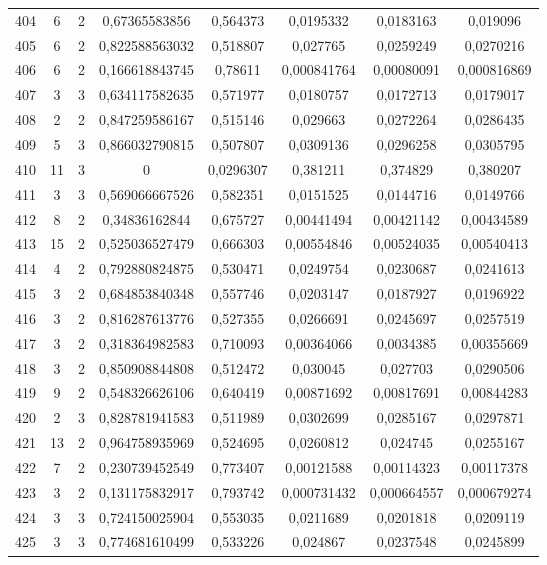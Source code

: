 \begin{longtable}{|c|c|c|c|c|c|c|c|}
404 & 6 & 2 & 0,67365583856 & 0,564373 & 0,0195332 & 0,0183163 & 0,019096  \\
405 & 6 & 2 & 0,822588563032 & 0,518807 & 0,027765 & 0,0259249 & 0,0270216  \\
406 & 6 & 2 & 0,166618843745 & 0,78611 & 0,000841764 & 0,00080091 & 0,000816869  \\
407 & 3 & 3 & 0,634117582635 & 0,571977 & 0,0180757 & 0,0172713 & 0,0179017  \\
408 & 2 & 2 & 0,847259586167 & 0,515146 & 0,029663 & 0,0272264 & 0,0286435  \\
409 & 5 & 3 & 0,866032790815 & 0,507807 & 0,0309136 & 0,0296258 & 0,0305795  \\
410 & 11 & 3 & 0 & 0,0296307 & 0,381211 & 0,374829 & 0,380207  \\
411 & 3 & 3 & 0,569066667526 & 0,582351 & 0,0151525 & 0,0144716 & 0,0149766  \\
412 & 8 & 2 & 0,34836162844 & 0,675727 & 0,00441494 & 0,00421142 & 0,00434589  \\
413 & 15 & 2 & 0,525036527479 & 0,666303 & 0,00554846 & 0,00524035 & 0,00540413  \\
414 & 4 & 2 & 0,792880824875 & 0,530471 & 0,0249754 & 0,0230687 & 0,0241613  \\
415 & 3 & 2 & 0,684853840348 & 0,557746 & 0,0203147 & 0,0187927 & 0,0196922  \\
416 & 3 & 2 & 0,816287613776 & 0,527355 & 0,0266691 & 0,0245697 & 0,0257519  \\
417 & 3 & 2 & 0,318364982583 & 0,710093 & 0,00364066 & 0,0034385 & 0,00355669  \\
418 & 3 & 2 & 0,850908844808 & 0,512472 & 0,030045 & 0,027703 & 0,0290506  \\
419 & 9 & 2 & 0,548326626106 & 0,640419 & 0,00871692 & 0,00817691 & 0,00844283  \\
420 & 2 & 3 & 0,828781941583 & 0,511989 & 0,0302699 & 0,0285167 & 0,0297871  \\
421 & 13 & 2 & 0,964758935969 & 0,524695 & 0,0260812 & 0,024745 & 0,0255167  \\
422 & 7 & 2 & 0,230739452549 & 0,773407 & 0,00121588 & 0,00114323 & 0,00117378  \\
423 & 3 & 2 & 0,131175832917 & 0,793742 & 0,000731432 & 0,000664557 & 0,000679274  \\
424 & 3 & 3 & 0,724150025904 & 0,553035 & 0,0211689 & 0,0201818 & 0,0209119  \\
425 & 3 & 3 & 0,774681610499 & 0,533226 & 0,024867 & 0,0237548 & 0,0245899  \\

\end{longtable}

